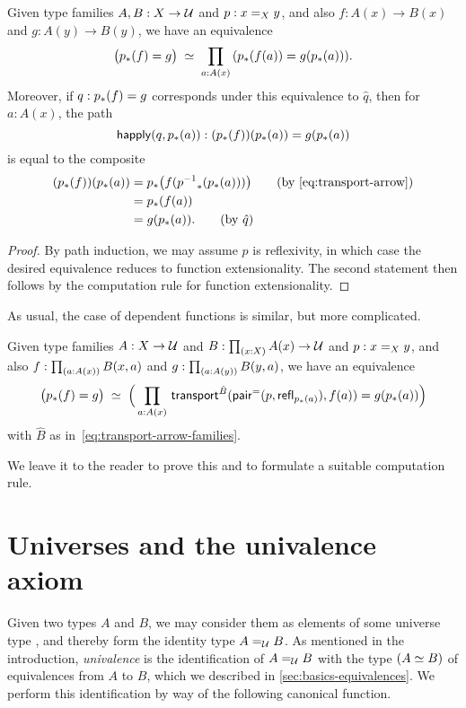 \begin{lem}\label{thm:dpath-arrow}
  Given type families $A,B:X\to\type$ and $p:\id[X]xy$, and also $f:A(x)\to B(x)$ and $g:A(y)\to B(y)$, we have an equivalence
  \[ \eqvspaced{ \big(\trans{p}{f} = {g}\big) } { \prd{a:A(x)}  (\trans{p}{f(a)} = g(\trans{p}{a})) }. \]
  Moreover, if $q:\trans{p}{f} = {g}$ corresponds under this equivalence to $\hat q$, then for $a:A(x)$, the path
  \[ \happly(q,\trans p a) : (\trans p f)(\trans p a) = g(\trans p a)\]
  is equal to the composite
  \begin{align*}
    (\trans p f)(\trans p a)
    &= \trans p {f (\trans {\opp p}{\trans p a})}
    \tag{by~\eqref{eq:transport-arrow}}\\
    &= \trans p {f(a)}\\
    &= g(\trans p a).
    \tag{by $\hat{q}$}
  \end{align*}
\end{lem}
\begin{proof}
  By path induction, we may assume $p$ is reflexivity, in which case the desired equivalence reduces to function extensionality.
  The second statement then follows by the computation rule for function extensionality.
\end{proof}

As usual, the case of dependent functions is similar, but more complicated.

\begin{lem}\label{thm:dpath-forall}
  Given type families $A:X\to\type$ and $B:\prd{x:X} A(x)\to\type$ and $p:\id[X]xy$, and also $f:\prd{a:A(x)} B(x,a)$ and $g:\prd{a:A(y)} B(y,a)$, we have an equivalence
  \[ \eqvspaced{ \big(\trans{p}{f} = {g}\big) } { \Big(\prd{a:A(x)}  \transfib{\hat{B}}{\pairpath(p,\refl{\trans pa})}{f(a)} = g(\trans{p}{a}) \Big) } \]
  with $\hat{B}$ as in~\eqref{eq:transport-arrow-families}.
\end{lem}

We leave it to the reader to prove this and to formulate a suitable computation rule.

%
%

\section{Universes and the univalence axiom}
\label{sec:compute-universe}

%
Given two types $A$ and $B$, we may consider them as elements of some universe type \type, and thereby form the identity type $\id[\type]AB$.
As mentioned in the introduction, \emph{univalence} is the identification of $\id[\type]AB$ with the type $(\eqv AB)$ of equivalences from $A$ to $B$, which we described in \autoref{sec:basics-equivalences}.
We perform this identification by way of the following canonical function.

